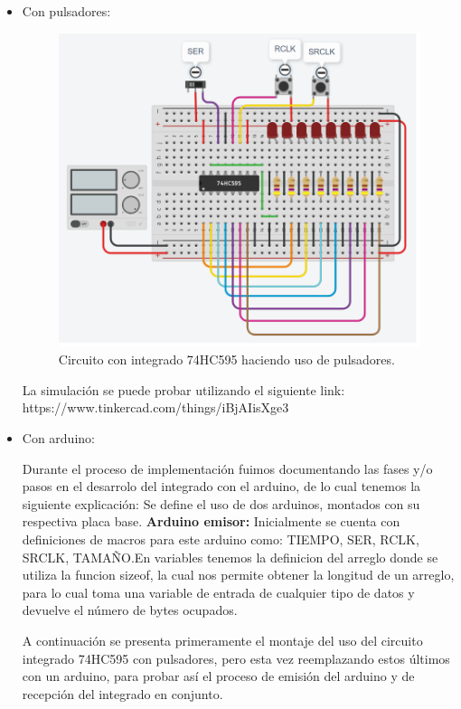 \documentclass{article}
\begin{document}
\begin{itemize}
\item Con pulsadores: 

\begin{figure}[h]
\includegraphics[scale=0.8]{pulsadores.png}
\centering
\caption{Circuito con integrado 74HC595 haciendo uso de pulsadores.}
\label{fig:pulsadores}
\end{figure}

La simulación se puede probar utilizando el siguiente link: https://www.tinkercad.com/things/iBjAIisXge3

\item Con arduino: 

Durante el proceso de implementación fuimos documentando las fases y/o pasos en el desarrolo del integrado con el arduino, de lo cual tenemos la siguiente explicación: \newline
Se define el uso de dos arduinos, montados con su respectiva placa base.
\textbf{Arduino emisor:} \newline
Inicialmente se cuenta con definiciones de macros para este arduino como: TIEMPO, SER, RCLK, SRCLK, TAMAÑO.En variables tenemos la definicion del arreglo donde se utiliza la funcion sizeof, la cual nos permite obtener la longitud de un arreglo, para lo cual toma una variable de entrada de cualquier tipo de datos y devuelve el número de bytes ocupados.

 A continuación se presenta primeramente el montaje del uso del circuito integrado 74HC595 con pulsadores, pero esta vez reemplazando estos últimos con un arduino, para probar así el proceso de emisión del arduino y de recepción del integrado en conjunto.


\end{itemize}
\end{document}
